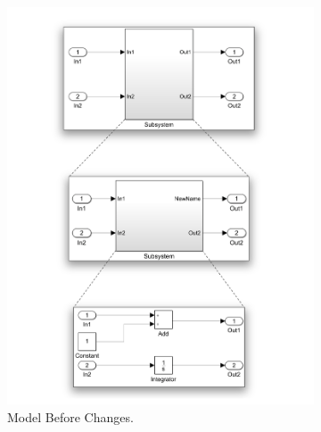 \documentclass{article}
\begin{document}
\begin{figure}[!htb]
\centering
  \begin{subfigure}[t]{.48\textwidth}
  \centering
    \includegraphics[width=\textwidth]{../figs/example/Before}
    \caption{Model Before Changes.}
  \end{subfigure}
  ~
  \begin{subfigure}[t]{.48\textwidth}
  \centering

\end{subfigure}
\end{figure}
\end{document}

